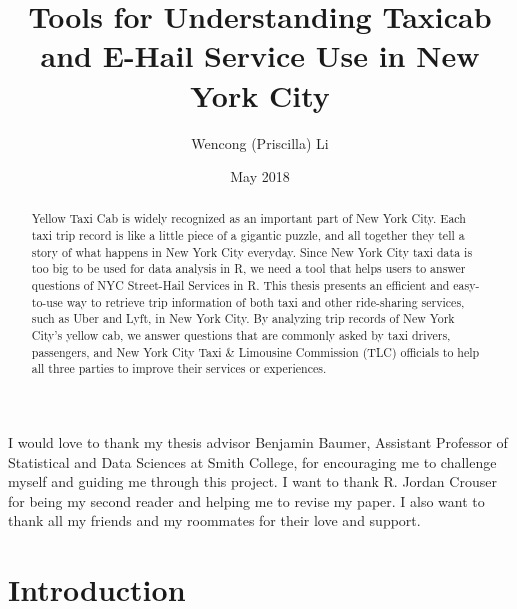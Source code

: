 \documentclass[12pt,twoside]{reedthesis}
\title{Tools for Understanding Taxicab and E-Hail Service Use in New York City}
\author{Wencong (Priscilla) Li}
\date{May 2018}
\theoremstyle{definition}
\theoremstyle{definition}
\theoremstyle{definition}
\theoremstyle{remark}
\begin{document}
  \maketitle

\frontmatter %
\pagestyle{empty} %
  \begin{acknowledgements}
    I would love to thank my thesis advisor Benjamin Baumer, Assistant
    Professor of Statistical and Data Sciences at Smith College, for
    encouraging me to challenge myself and guiding me through this project.
    I want to thank R. Jordan Crouser for being my second reader and helping
    me to revise my paper. I also want to thank all my friends and my
    roommates for their love and support.
  \end{acknowledgements}

  \hypersetup{linkcolor=black}
  \setcounter{tocdepth}{2}
  \tableofcontents

  \listoftables

  \listoffigures
  \begin{abstract}
    Yellow Taxi Cab is widely recognized as an important part of New York
    City. Each taxi trip record is like a little piece of a gigantic puzzle,
    and all together they tell a story of what happens in New York City
    everyday. Since New York City taxi data is too big to be used for data
    analysis in R, we need a tool that helps users to answer questions of
    NYC Street-Hail Services in R. This thesis presents an efficient and
    easy-to-use way to retrieve trip information of both taxi and other
    ride-sharing services, such as Uber and Lyft, in New York City. By
    analyzing trip records of New York City's yellow cab, we answer
    questions that are commonly asked by taxi drivers, passengers, and New
    York City Taxi \& Limousine Commission (TLC) officials to help all three
    parties to improve their services or experiences.
  \end{abstract}

\mainmatter %
\pagestyle{fancyplain} %

\chapter{Introduction}\label{introduction}
\end{document}
